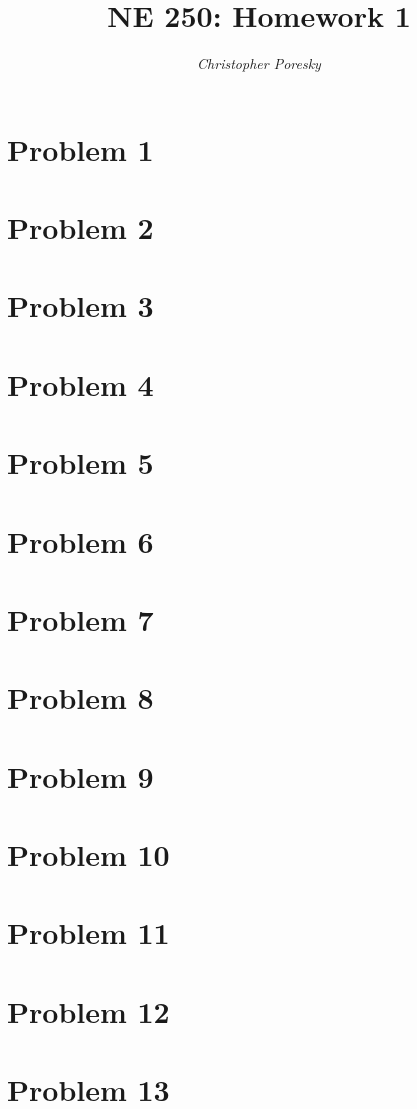 \documentclass{article}
\author{\textit {Christopher Poresky}}
\title{\textbf {NE 250: Homework 1}}
\begin{document}
\maketitle
\section*{Problem 1}

\section*{Problem 2}

\section*{Problem 3}

\section*{Problem 4}

\section*{Problem 5}

\section*{Problem 6}

\section*{Problem 7}

\section*{Problem 8}

\section*{Problem 9}

\section*{Problem 10}

\section*{Problem 11}

\section*{Problem 12}

\section*{Problem 13}
\end{document}
